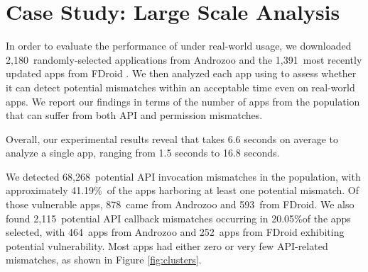 \section{Case Study: Large Scale Analysis}

\def \apitotalALL {68,268}
\def \apctotalALL {2,115}

\def \apicountALL {1,471}
\def \apiprcntALL {41.19\%}
\def \apicountZOO {878}
\def \apicountFDR {593}

\def \apccountALL {761}
\def \apcprcntALL {20.05\%}
\def \apccountZOO {464}
\def \apccountFDR {252}

\def \andzooct {2,180}
\def \fdroidct {1,391}

\def \prqcount {224}
\def \prqprcnt {12.34\%}
\def \prqtotal {1,815}

\def \prvcount {1,206}
\def \prvprcnt {68.68\%}
\def \prvtotal {1,756}

In order to evaluate the performance of \@approach under real-world usage, we
downloaded \andzooct\ randomly-selected applications from Androzoo
\cite{allix2016androzoo} and the \fdroidct\ most recently updated apps from
FDroid \cite{fdroid}.  We then analyzed each app using \@approach to assess
whether it can detect potential mismatches within an acceptable time even on
real-world apps. We report our findings in terms of the number of apps from the
population that can suffer from both API and permission mismatches. 

Overall, our experimental results reveal that \@approach takes 6.6 seconds on
average to analyze a single app, ranging from 1.5 seconds to 16.8 seconds. 

We detected \apitotalALL\ potential API invocation mismatches in the population,
with approximately \apiprcntALL\ of the apps harboring at least one potential
mismatch.  Of those vulnerable apps, \apicountZOO\ came from Androzoo and
\apicountFDR\ from FDroid. We also found \apctotalALL\ potential API callback
mismatches occurring in \apcprcntALL of the apps selected, with \apccountZOO\
apps from Androzoo and \apccountFDR\ apps from FDroid exhibiting potential
vulnerability. Most apps had either zero or very few API-related mismatches, as
shown in Figure \ref{fig:clusters}.

